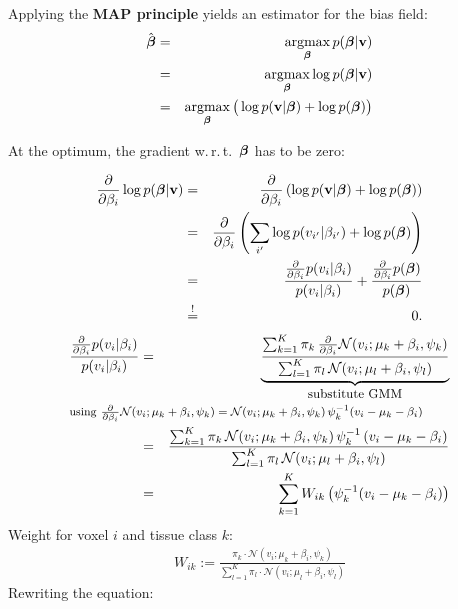   Applying the   \textbf{MAP principle} yields an estimator for the bias field:
  \begin{eqnarray*}
    \hat{\bm{\mathrm{\beta}}} &=& \operatorname*{argmax}_{\bm{\mathrm{\beta}}} p(\bm{\mathrm{\beta}} | \bm{\mathrm{v}}) \\   
                     &=& \operatorname*{argmax}_{\bm{\mathrm{\beta}}} \log p(\bm{\mathrm{\beta}} | \bm{\mathrm{v}}) \\   
                     &=& \operatorname*{argmax}_{\bm{\mathrm{\beta}}} \big( \log p(\bm{\mathrm{v}} | \bm{\mathrm{\beta}}) + \log p(\bm{\mathrm{\beta}}) \big)
  \end{eqnarray*}
     
At the optimum, the gradient w.\,r.\,t.\ $\bm{\mathrm{\beta}}$ has to be zero:

  \begin{eqnarray*}
    \frac{\partial}{\partial \beta_i} \log p(\bm{\mathrm{\beta}} | \bm{\mathrm{v}}) 
    &=& \frac{\partial}{\partial \beta_i} \left( \log p(\bm{\mathrm{v}} | \bm{\mathrm{\beta}}) + \log p(\bm{\mathrm{\beta}}) \right) \\   
    &=& \frac{\partial}{\partial \beta_i} \left( \sum_{i'} \log p(v_{i'} | \beta_{i'}) + \log p(\bm{\mathrm{\beta}}) \right) \\   
    &=& \frac{\frac{\partial}{\partial \beta_i} p(v_i | \beta_i)}{p(v_i | \beta_i)} + \frac{\frac{\partial}{\partial \beta_i} p(\bm{\mathrm{\beta}})}{p(\bm{\mathrm{\beta}})} \\
    &\stackrel{!}{=}& 0.
  \end{eqnarray*}
  {\footnotesize
  \begin{eqnarray*}
    \frac{\frac{\partial}{\partial \beta_i} p(v_i | \beta_i)}{p(v_i | \beta_i)} 
    &=& \underbrace{
          \frac{\sum_{k=1}^K \pi_k \, \frac{\partial}{\partial \beta_i} {\mathcal N}(v_i ; \mu_k + \beta_i, \psi_k) }
               {\sum_{l=1}^K \pi_l \, {\mathcal N}(v_i ; \mu_l + \beta_i, \psi_l)}
        }_{\mbox{\small substitute GMM}}   \\  
    \noalign{\hbox{\footnotesize using $\frac{\partial}{\partial\beta_i}\mathcal N(v_i;\mu_k+\beta_i,\psi_k)=\mathcal N(v_i;\mu_k+\beta_i,\psi_k)\,\psi_k^{-1}(v_i-\mu_k-\beta_i)$}}
    &=& \frac{\sum_{k=1}^K \pi_k \, {\mathcal N}(v_i ; \mu_k + \beta_i, \psi_k) \, \psi_k^{-1} \, (v_i - \mu_k - \beta_i)}
             {\sum_{l=1}^K \pi_l \, {\mathcal N}(v_i ; \mu_l + \beta_i, \psi_l) }  \\    
    &=& \sum_{k=1}^K W_{ik} \left( \psi_k^{-1} (v_i - \mu_k - \beta_i) \right)
  \end{eqnarray*}
  }
 Weight for voxel $i$ and tissue class $k$:
  {\footnotesize
  \begin{eqnarray*}
    W_{ik} := 
      \frac{\pi_k \cdot \mathcal{N}(v_i ; \mu_k + \beta_i, \psi_k) }
           {\sum_{l=1}^K \pi_l \cdot \mathcal{N}(v_i ; \mu_l + \beta_i, \psi_l)} 
  \end{eqnarray*}
  }
 Rewriting the equation:

